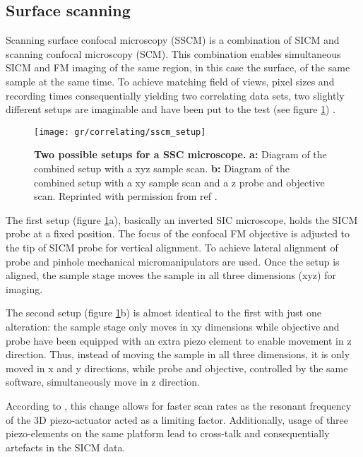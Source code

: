 \subsection{Surface scanning}

Scanning surface confocal microscopy (SSCM) \cite{Gorelik2002} is a combination of SICM and scanning
confocal microscopy (SCM). This combination enables simultaneous SICM and FM imaging of
the same region, in this case the surface, of the same sample at the same time. To achieve matching
field of views, pixel sizes and recording times consequentially yielding two correlating data sets,
two slightly different setups are imaginable and have been put to the test (see figure 
\ref{fig:sscm_setup}) \cite{Gorelik2002}\cite{Shevchuk2013}.

\begin{figure}
  \texttt{[image: gr/correlating/sscm\_setup]}
  \caption{%
    \textbf{Two possible setups for a SSC microscope.}
    \textbf{a:} Diagram of the combined setup with a xyz sample scan.
    \textbf{b:} Diagram of the combined setup with a xy sample scan and a z probe and objective scan. 
    Reprinted with permission from ref \cite{Shevchuk2013}.
  }
  \label{fig:sscm_setup}
\end{figure}

The first setup (figure \ref{fig:sscm_setup}a), basically an inverted SIC microscope, holds the 
SICM probe at a fixed position. The focus of the confocal FM objective is adjusted to the tip of SICM 
probe for vertical alignment. To achieve lateral alignment of probe and pinhole mechanical 
micromanipulators are used. Once the setup is aligned, the sample stage moves the sample in all three 
dimensions (xyz) for imaging.

The second setup (figure \ref{fig:sscm_setup}b) is almost identical to the first with just one 
alteration: the sample stage only moves in xy dimensions while objective and probe have been equipped 
with an extra piezo element to enable movement in z direction. Thus, instead of moving the sample in
all three dimensions, it is only moved in x and y directions, while probe and objective, controlled by
the same software, simultaneously move in z direction. 

According to \cite{Shevchuk2013}, this change allows for faster scan rates as the resonant frequency
of the 3D piezo-actuator acted as a limiting factor. Additionally, usage of three piezo-elements on the
same platform lead to cross-talk and consequentially artefacts in the SICM data.

